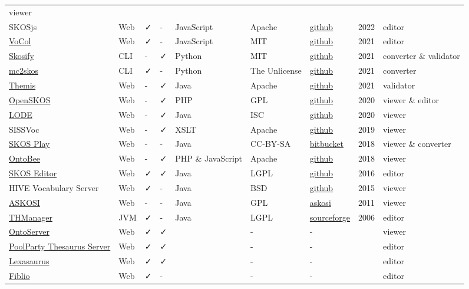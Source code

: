 \documentclass[
  DIV=10]{article}
\begin{document}
\begin{longtable}[]{@{}lllllllll@{}}
viewer \\
SKOSjs & Web & ✓ & - & JavaScript & Apache &
\href{https://github.com/tkurz/skosjs}{github} & 2022 & editor \\
\href{https://www.vocoreg.com/}{VoCol} & Web & ✓ & - & JavaScript & MIT
& \href{https://github.com/vocol/vocol}{github} & 2021 & editor \\
\href{https://skosify.readthedocs.io/en/latest/}{Skosify} & CLI & - & ✓
& Python & MIT & \href{https://github.com/NatLibFi/Skosify}{github} &
2021 & converter \& validator \\
\href{https://github.com/scriptotek/mc2skos}{mc2skos} & CLI & ✓ & - &
Python & The Unlicense &
\href{https://github.com/scriptotek/mc2skos}{github} & 2021 &
converter \\
\href{http://themis.linkeddata.es/}{Themis} & Web & - & ✓ & Java &
Apache & \href{https://github.com/oeg-upm/Themis}{github} & 2021 &
validator \\
\href{http://openskos.org/}{OpenSKOS} & Web & - & ✓ & PHP & GPL &
\href{https://github.com/OpenSKOS/OpenSKOS}{github} & 2020 & viewer \&
editor \\
\href{https://essepuntato.it/lode/}{LODE} & Web & - & ✓ & Java & ISC &
\href{https://github.com/essepuntato/LODE}{github} & 2020 & viewer \\
SISSVoc & Web & - & ✓ & XSLT & Apache &
\href{https://github.com/SISS/sissvoc}{github} & 2019 & viewer \\
\href{https://skos-play.sparna.fr/play/about}{SKOS Play} & Web & - & - &
Java & CC-BY-SA &
\href{https://bitbucket.org/tfrancart/sparna/src/master/}{bitbucket} &
2018 & viewer \& converter \\
\href{https://ontobee.org/}{OntoBee} & Web & - & ✓ & PHP \& JavaScript &
Apache & \href{https://github.com/OntoZoo/ontobee}{github} & 2018 &
viewer \\
\href{https://jbiomedsem.biomedcentral.com/articles/10.1186/s13326-015-0043-z}{SKOS
Editor} & Web & ✓ & ✓ & Java & LGPL &
\href{https://github.com/Blulab-Utah/SKOSEditor}{github} & 2016 &
editor \\
HIVE Vocabulary Server & Web & ✓ & - & Java & BSD &
\href{https://github.com/MetadataResearchCenter/hive-mrc}{github} & 2015
& viewer \\
\href{http://www.askosi.org/}{ASKOSI} & Web & - & - & Java & GPL &
\href{http://www.askosi.org/example/}{askosi} & 2011 & viewer \\
\href{https://thmanager.sourceforge.io/}{THManager} & JVM & ✓ & - & Java
& LGPL & \href{https://sourceforge.net/projects/thmanager/}{sourceforge}
& 2006 & editor \\
\href{https://ontoserver.csiro.au/}{OntoServer} & Web & ✓ & ✓ & & - & -
& & viewer \\
\href{https://www.poolparty.biz/poolparty-thesaurus-manager}{PoolParty
Thesaurus Server} & Web & ✓ & ✓ & & - & - & & editor \\
\href{http://www.k-int.com/products/lexaurus/}{Lexasaurus} & Web & ✓ & ✓
& & - & - & & editor \\
\href{https://www.fiblio.de/}{Fiblio} & Web & ✓ & - & & - & - & &
editor \\


\end{longtable}
\end{document}
